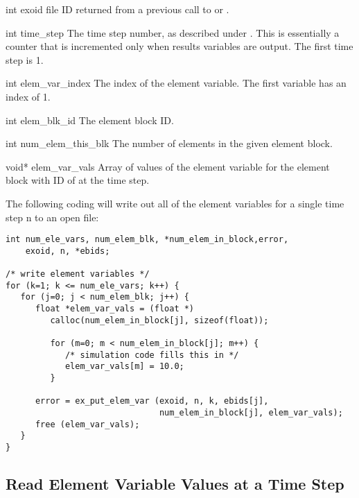 \begin{parameters}
\item[{int exoid \R{}}]
\exo{} file ID returned from a previous call to  or
.

\item[{int time_step \R{}}]
The time step number, as described under .
This is essentially a counter that is incremented only when results
variables are output. The first time step is 1.

\item[{int elem_var_index \R{}}]
The index of the element variable. The first variable has
an index of 1.

\item[{int elem_blk_id \R{}}]
The element block ID.

\item[{int num_elem_this_blk \R{}}]
The number of elements in the given element block.

\item[{void* elem_var_vals \R{}}]
Array of  values of the \th{}
element variable for the element block with ID of 
at the \th{} time step.
\end{parameters}

The following coding will write out all of the element variables for a
single time step {n} to an open \exo{} file:

\begin{lstlisting}
int num_ele_vars, num_elem_blk, *num_elem_in_block,error,
    exoid, n, *ebids;

/* write element variables */
for (k=1; k <= num_ele_vars; k++) {
   for (j=0; j < num_elem_blk; j++) {
      float *elem_var_vals = (float *)
         calloc(num_elem_in_block[j], sizeof(float));

         for (m=0; m < num_elem_in_block[j]; m++) {
            /* simulation code fills this in */
            elem_var_vals[m] = 10.0;
         }

      error = ex_put_elem_var (exoid, n, k, ebids[j],
                               num_elem_in_block[j], elem_var_vals);
      free (elem_var_vals);
   }
}
\end{lstlisting}

\subsection{Read Element Variable Values at a Time Step}

